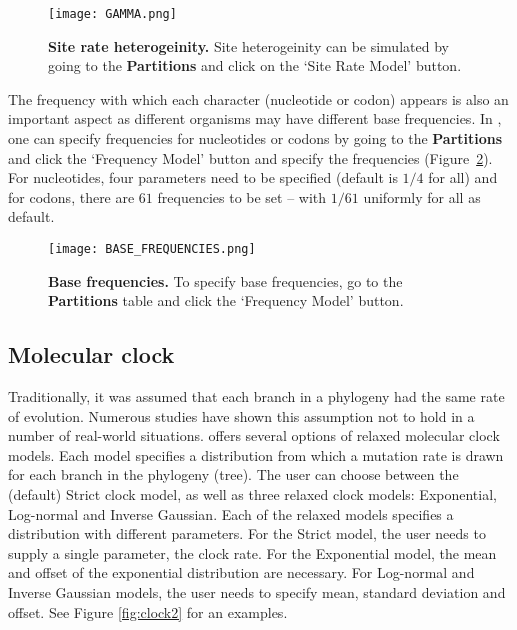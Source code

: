 \begin{figure}[h!]
\centering
\texttt{[image: GAMMA.png]} 
\caption{
{ \footnotesize 
{\bf Site rate heterogeinity.}
Site heterogeinity can be simulated by going to the \textbf{Partitions} and click on the `Site Rate Model' button.
} %
}
\label{fig:gamma}
\end{figure}

The frequency with which each character (nucleotide or codon) appears is also an important aspect as different organisms may have different base frequencies. 
In {\bussname}, one can specify frequencies for nucleotides or codons by going to the \textbf{Partitions} and click the `Frequency Model' button and specify the frequencies (Figure~\ref{fig:bases}). For nucleotides, four parameters need to be specified (default is $1/4$ for all) and for codons, there are $61$ frequencies to be set -- with $1/61$ uniformly for all as default.

\begin{figure}[h!]
\centering
\texttt{[image: BASE\_FREQUENCIES.png]} 
\caption{
{ \footnotesize 
{\bf Base frequencies.}
To specify base frequencies, go to the \textbf{Partitions} table and click the `Frequency Model' button.
} %
}
\label{fig:bases}
\end{figure}

\subsection{Molecular clock}

Traditionally, it was assumed that each branch in a phylogeny had the same rate of evolution. 
Numerous studies have shown this assumption not to hold in a number of real-world situations. 
{\bussname} offers several options of relaxed molecular clock models. 
Each model specifies a distribution from which a mutation rate is drawn for each branch in the phylogeny (tree). 
The user can choose between the (default) Strict clock model, as well as three relaxed clock models: Exponential, Log-normal and Inverse Gaussian. 
Each of the relaxed models specifies a distribution with different parameters. 
For the Strict model, the user needs to supply a single parameter, the clock rate. 
For the Exponential model, the mean and offset of the exponential distribution are necessary. 
For Log-normal and Inverse Gaussian models, the user needs to specify mean, standard deviation and offset. 
See Figure \ref{fig:clock2} for an examples.  

